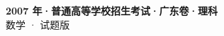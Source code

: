 \documentclass[zihao=-4, a4paper]{ctexart}
\begin{document}
\begin{center}
  {\Large\bfseries 2007 年·普通高等学校招生考试·广东卷·理科}\\[4pt]
  {\large 数学 · 试题版}
\end{center}
\medskip
{}

\end{document}
